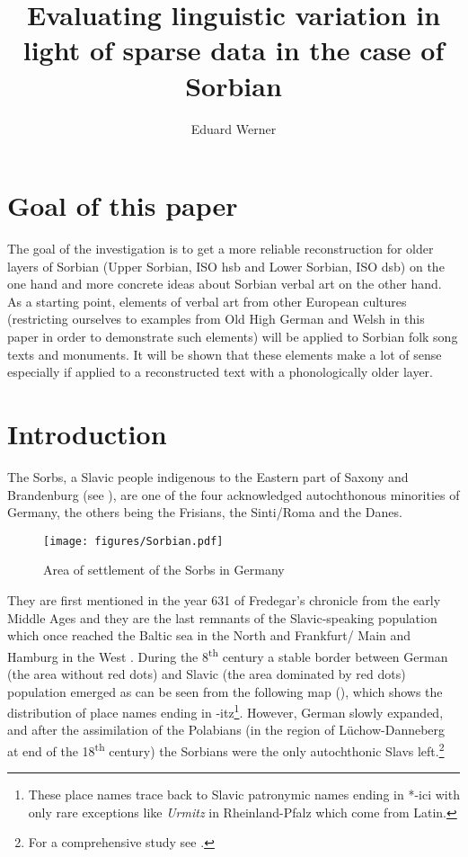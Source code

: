 \documentclass[output=paper,hidelinks]{langscibook}
\author{Eduard Werner}
\title{Evaluating linguistic variation in light of sparse data in the case of Sorbian}
\begin{document}
\maketitle



\section{Goal of this paper}

 
The goal of the investigation is to get a more reliable reconstruction for older layers of Sorbian (Upper Sorbian, ISO hsb and Lower Sorbian, ISO dsb) on the one hand and more concrete ideas about Sorbian verbal art on the other hand. As a starting point, elements of verbal art from other European cultures (restricting ourselves to examples from Old High German and Welsh in this paper in order to demonstrate such elements) will be applied to Sorbian folk song texts and monuments. It will be shown that these elements make a lot of sense especially if applied to a reconstructed text with a phonologically older layer.
 

\section{Introduction}
 
The Sorbs, a Slavic people indigenous to the Eastern part of Saxony and Brandenburg (see ), are one of the four acknowledged autochthonous minorities of Germany, the others being the Frisians, the Sinti/Roma and the Danes.
 

\begin{figure}
  \texttt{[image: figures/Sorbian.pdf]}
  \caption{Area of settlement of the Sorbs in Germany}
 \label{fig:werner:1}
\end{figure}
 
They are first mentioned in the year 631 of Fredegar’s chronicle from the early Middle Ages and they are the last remnants of the Slavic-speaking population which once reached the Baltic sea in the North and Frankfurt/ Main and Hamburg in the West \citep[13]{Stone2015}. During the 8\textsuperscript{th} century a stable border between German (the area without red dots) and Slavic (the area dominated by red dots) population emerged as can be seen from the following map (), which shows the distribution of place names ending in -itz\footnote{These place names trace back to Slavic patronymic names ending in *-ici with only rare exceptions like \textit{Urmitz} in Rheinland-Pfalz which come from Latin.}. However, German slowly expanded, and after the assimilation of the Polabians (in the region of Lüchow-Danneberg at end of the 18\textsuperscript{th} century) the Sorbians were the only autochthonic Slavs left.\footnote{For a comprehensive study see \citealt{Stone2015}.}
 
\end{document}
